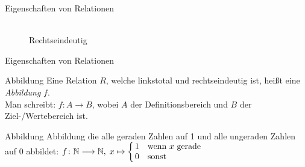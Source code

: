 \begin{frame}{Eigenschaften von Relationen}
\begin{figure}
\begin{minipage}{0.44\textwidth}
      \\ Rechtseindeutig
    \end{minipage}
  \end{figure}
\end{frame}


\begin{frame}{Eigenschaften von Relationen}
  \begin{block}{Abbildung}
    Eine Relation $R$, welche linkstotal und rechtseindeutig ist, heißt eine \emph{Abbildung} $f$. \\
    \vspace{6pt}
    Man schreibt: $f: A \to B$, wobei $A$ der Definitionsbereich und $B$ der Ziel-/Wertebereich ist.
  \end{block}
  \begin{exampleblock}{Abbildung}
      Abbildung die alle geraden Zahlen auf 1 und alle ungeraden Zahlen auf 0 abbildet:
      $f \from \N \functionto \N, \; x \mapsto \casesl{ 1 & \text{wenn $x$ gerade} \\ 0 & \text{sonst} }$
  \end{exampleblock}
\end{frame}


